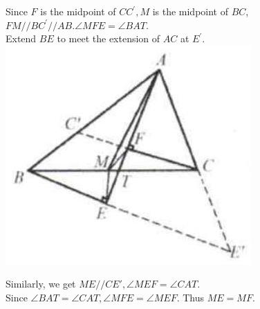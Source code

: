 \documentclass{article}
\begin{document}
Since \(F\) is the midpoint of \(C C^{\prime}, M\) is the midpoint of \(B C\), \(F M / / B C^{\prime} / / A B . \angle M F E=\angle B A T\).\\
Extend \(B E\) to meet the extension of \(A C\) at \(E^{\prime}\).\\
\centering
\includegraphics[width=\textwidth]{images/068(1).jpg}


Similarly, we get \(M E / / C E \prime, \angle M E F=\angle C A T\).\\
Since \(\angle B A T=\angle C A T, \angle M F E=\angle M E F\). Thus \(M E=M F\).
\end{document}

